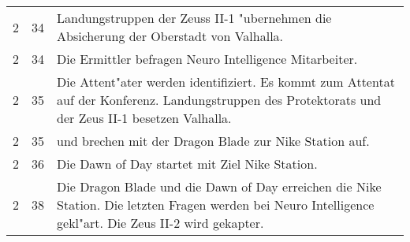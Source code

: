 \begin{boxedtext}
\begin{tabularx}{\textwidth}{r r X}
        2       &   34 & Landungstruppen der Zeuss II-1 "ubernehmen die Absicherung der Oberstadt von Valhalla.\\
        2       &   34 & Die Ermittler befragen Neuro Intelligence Mitarbeiter.\\
        2       &   35 & Die Attent"ater werden identifiziert. Es kommt zum Attentat auf der Konferenz. Landungstruppen des 
                         Protektorats  und der Zeus II-1 besetzen Valhalla. \\
        2       &   35 & \xl{} und \ml{} brechen mit der Dragon Blade zur Nike Station auf.\\
        2       &   36 & Die Dawn of Day startet mit Ziel Nike Station.\\
        2       &   38 & Die Dragon Blade und die Dawn of Day erreichen die Nike Station. Die letzten Fragen werden bei Neuro Intelligence 
                         gekl"art. Die Zeus II-2 wird gekapter.\\
    \end{tabularx}
\end{boxedtext}
\renewcommand{\arraystretch}{1}
\pagebreak
